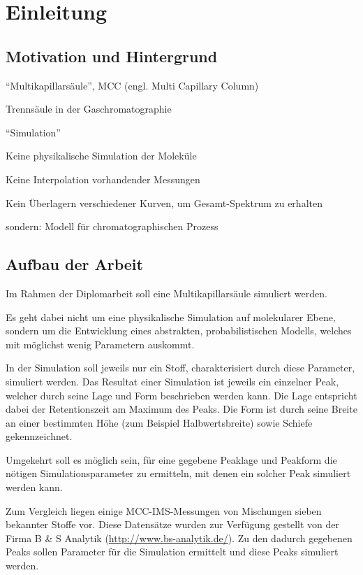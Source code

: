 \label{chapter:ein}

\chapter{Einleitung}
\section{Motivation und Hintergrund}
``Multikapillarsäule'', MCC (engl. Multi Capillary Column)

Trennsäule in der Gaschromatographie

``Simulation''

Keine physikalische Simulation der Moleküle

 Keine Interpolation vorhandender Messungen

 Kein Überlagern verschiedener Kurven, um Gesamt-Spektrum zu erhalten
 
 sondern: Modell für chromatographischen Prozess



\section{Aufbau der Arbeit}
Im Rahmen der Diplomarbeit soll eine Multikapillarsäule simuliert werden. 

Es geht dabei nicht um eine physikalische Simulation auf molekularer Ebene, sondern um die Entwicklung eines abstrakten, probabilistischen Modells, welches mit möglichst wenig Parametern auskommt. 

In der Simulation soll jeweils nur ein Stoff, charakterisiert durch diese Parameter, simuliert werden. Das Resultat einer Simulation ist jeweils ein einzelner Peak, welcher durch seine Lage und Form beschrieben werden kann. Die Lage entspricht dabei der Retentionszeit am Maximum des Peaks. Die Form ist durch seine Breite an einer bestimmten Höhe (zum Beispiel Halbwertsbreite) sowie Schiefe gekennzeichnet.

Umgekehrt soll es möglich sein, für eine gegebene Peaklage und Peakform die nötigen Simulationsparameter zu ermitteln, mit denen ein solcher Peak simuliert werden kann.

Zum Vergleich liegen einige MCC-IMS-Messungen von Mischungen sieben bekannter Stoffe vor. Diese Datensätze wurden zur Verfügung gestellt von der Firma B \& S Analytik  (\mbox{\url{http://www.bs-analytik.de/}}). Zu den dadurch gegebenen Peaks sollen Parameter für die Simulation ermittelt und diese Peaks simuliert werden.

